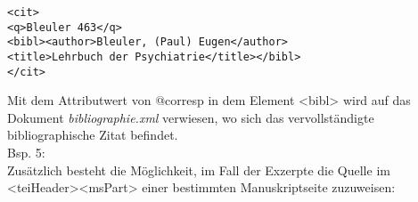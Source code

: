 \documentclass{article}
\begin{document}
        \begin{verbatim}<cit>
<q>Bleuler 463</q>
<bibl><author>Bleuler, (Paul) Eugen</author>
<title>Lehrbuch der Psychiatrie</title></bibl>
</cit>\end{verbatim}Mit dem Attributwert von @corresp in dem Element <bibl>
                  wird auf das Dokument \emph{bibliographie.xml} verwiesen, wo sich
                  das vervollständigte bibliographische Zitat befindet.\\
            
        Bsp. 5:\\
            
        Zusätzlich besteht die Möglichkeit, im Fall der Exzerpte die Quelle im <teiHeader><msPart> einer bestimmten
                  Manuskriptseite zuzuweisen:\\
            
\end{document}
